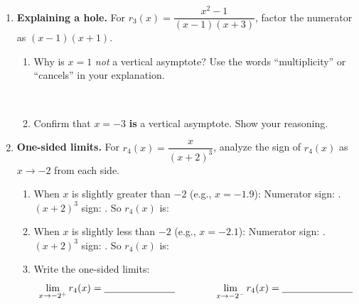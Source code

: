 \documentclass[10pt]{article}
\begin{document}
\begin{tcolorbox}[colback=white, colframe=black!40,
    title=\textbf{Tier E --- Extend},
    fonttitle=\bfseries, arc=2mm, left=3mm, right=3mm, top=2mm, bottom=2mm]

\begin{enumerate}[itemsep=12pt]
  \item \textbf{Explaining a hole.} For $r_3(x) = \dfrac{x^2 - 1}{(x-1)(x+3)}$,
        factor the numerator as $(x-1)(x+1)$.

        \begin{enumerate}[label=(\alph*), itemsep=5pt]
          \item Why is $x = 1$ \emph{not} a vertical asymptote? Use the words
                ``multiplicity'' or ``cancels'' in your explanation.

                \vspace{0.25in}
                \writeline\\[4pt]
                \writeline

          \item Confirm that $x = -3$ \textbf{is} a vertical asymptote. Show your reasoning.

                \vspace{0.25in}
                \writeline
        \end{enumerate}

  \item \textbf{One-sided limits.} For $r_4(x) = \dfrac{x}{(x+2)^3}$, analyze the sign
        of $r_4(x)$ as $x \to -2$ from each side.

        \begin{enumerate}[label=(\alph*), itemsep=6pt]
          \item When $x$ is slightly greater than $-2$ (e.g., $x = -1.9$):
                Numerator sign: \blank{2cm}. \quad $(x+2)^3$ sign: \blank{2cm}.
                \quad So $r_4(x)$ is: \blank{2cm}

          \item When $x$ is slightly less than $-2$ (e.g., $x = -2.1$):
                Numerator sign: \blank{2cm}. \quad $(x+2)^3$ sign: \blank{2cm}.
                \quad So $r_4(x)$ is: \blank{2cm}

          \item Write the one-sided limits:
                \[
                  \lim_{x \to -2^+} r_4(x) = \blank{2.5cm}
                  \qquad\qquad
                  \lim_{x \to -2^-} r_4(x) = \blank{2.5cm}
                \]
        \end{enumerate}
\end{enumerate}
\end{tcolorbox}
\end{document}
